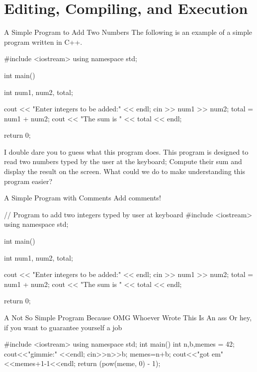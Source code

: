 \documentclass[../lecture1-introduction.tex]{subfiles}
\begin{document}
\section{Editing, Compiling, and Execution}

\begin{frame}[fragile]{A Simple Program to Add Two Numbers}
    The following is an example of a simple program written in C++.
\begin{cppcode}[]
#include <iostream>
using namespace std;

int main()
{
    int num1, num2, total;

    cout << "Enter integers to be added:" << endl;
    cin >> num1 >> num2;
    total = num1 + num2;
    cout << "The sum is " << total << endl;

    return 0;
}
\end{cppcode}
    {
        I double dare you to guess what this program does.
    }
    {
        This program is designed to read two numbers typed by the user at the
        keyboard; Compute their sum and display the result on the screen.
    }
    {
        What could we do to make understanding this program easier?
    }
\end{frame}


\begin{frame}[fragile]{A Simple Program with Comments}
    Add comments!
\begin{cppcode}[]
// Program to add two integers typed by user at keyboard
#include <iostream>
using namespace std;

int main()
{
    int num1, num2, total;

    cout << "Enter integers to be added:" << endl;
    cin >> num1 >> num2;
    total = num1 + num2;
    cout << "The sum is " << total << endl;

    return 0;
}
\end{cppcode}
\end{frame}


\begin{frame}[fragile]{A Not So Simple Program Because OMG Whoever Wrote This Is An \tiny{ass}}
    Or hey, if you want to guarantee yourself a job
\begin{cppcode}[]
#include <iostream>
using namespace std;
int main(){
    int n,b,memes = 42;
cout<<"gimmie:" <<endl;
        cin>>n>>b;
    memes=n+b;
cout<<"got em" <<memes+1-1<<endl;
    return (pow(meme, 0) - 1);}
\end{cppcode}
\end{frame}
\end{document}
